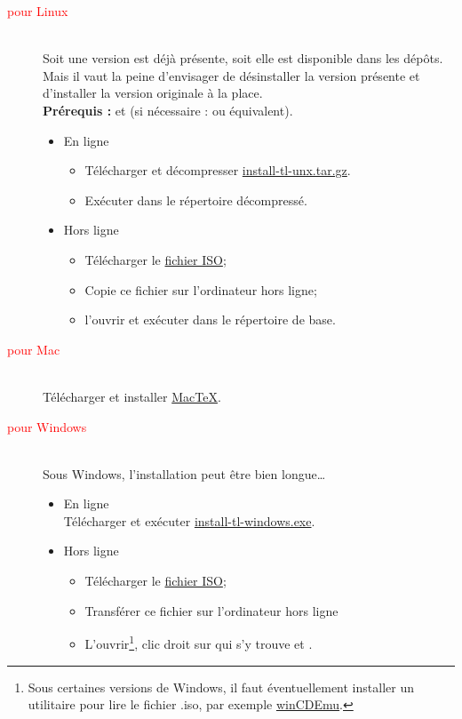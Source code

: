 \begin{description}
	\item[\textcolor{red}{pour Linux}] ~\\
		Soit une version est déjà présente, soit elle est disponible dans les dépôts. Mais il vaut la peine d'envisager de désinstaller la version présente et d'installer la version originale à la place. \\
		\textbf{Prérequis : }  et  \quad (si nécessaire :  ou équivalent).
		\begin{itemize}
			\item En ligne
				\begin{itemize}
					\item Télécharger et décompresser \href{http://mirror.ctan.org/systems/texlive/tlnet/install-tl-unx.tar.gz}{install-tl-unx.tar.gz}.
					\item Exécuter  dans le répertoire décompressé.
				\end{itemize}
			\item Hors ligne
				\begin{itemize}
					\item Télécharger le \href{http://mirror.ctan.org/systems/texlive/Images/}{fichier ISO};
					\item Copie ce fichier sur l'ordinateur hors ligne;
					\item l'ouvrir et exécuter  dans le répertoire de base.
				\end{itemize}
		\end{itemize}
	\item[\textcolor{red}{pour Mac}] ~\\
		Télécharger et installer \href{http://www.tug.org/mactex}{MacTeX}.
	\item[\textcolor{red}{pour Windows}] ~\\
		\attention Sous Windows, l'installation peut être bien longue\dots
		\begin{itemize}
			\item En ligne \\
				Télécharger et exécuter \href{http://mirror.ctan.org/systems/texlive/tlnet/install-tl-windows.exe}{install-tl-windows.exe}.
			\item Hors ligne
				\begin{itemize}
					\item Télécharger le \href{http://mirror.ctan.org/systems/texlive/Images/}{fichier ISO};
					\item Transférer ce fichier sur l'ordinateur hors ligne
					\item L'ouvrir\footnote{Sous certaines versions de Windows, il faut éventuellement installer un utilitaire pour lire le fichier .iso, par exemple \href{http://wincdemu.sysprogs.org/}{winCDEmu}.}, clic droit sur  qui s'y trouve et \newline {}.
				\end{itemize}
		\end{itemize}
\end{description}



